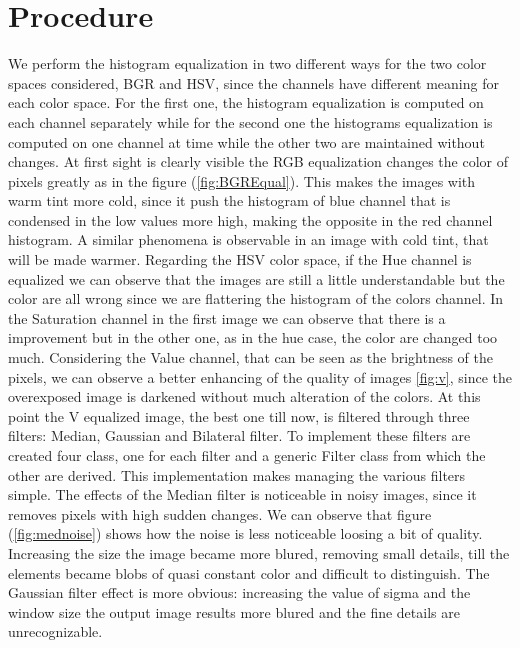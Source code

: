 \documentclass[11pt,a4paper]{article}
\newcommand{\cc}{\fontfamily{txtt}\selectfont}
\begin{document}
\section{Procedure}
We perform the histogram equalization in two different ways for the two color spaces considered, BGR and HSV, since the channels have different meaning for each color space.
For the first one, the histogram equalization is computed on each channel separately while for the second one the histograms equalization is computed on one channel at time while the other two are maintained without changes.
At first sight is clearly visible the RGB equalization changes the color of pixels greatly as in the figure (\ref{fig:BGREqual}).
This makes the images with warm tint more cold, since it push the histogram of blue channel that is condensed in the low values more high, making the opposite in the red channel histogram.
A similar phenomena is observable in an image with cold tint, that will be made warmer.\newline
Regarding the HSV color space, if the Hue channel is equalized we can observe that the images are still a little understandable but the color are all wrong since we are flattering the histogram of the colors channel.
In the Saturation channel in the first image we can observe that there is a improvement but in the other one, as in the hue case, the color are changed too much.
Considering the Value channel, that can be seen as the brightness of the pixels, we can observe a better enhancing of the quality of images \ref{fig:v}, since the overexposed image is darkened without much alteration of the colors.\newline
At this point the V equalized image, the best one till now, is filtered through three filters: Median, Gaussian and Bilateral filter.
To implement these filters are created four class, one for each filter and a generic {\cc Filter} class from which the other are derived.
This implementation makes managing the various filters simple.
The effects of the Median filter is noticeable in noisy images, since it removes pixels with high sudden changes.
We can observe that figure (\ref{fig:mednoise}) shows how the noise is less noticeable loosing a bit of quality.
Increasing the size the image became more blured, removing small details, till the elements became blobs of quasi constant color and difficult to distinguish.\newline
The Gaussian filter effect is more obvious: increasing the value of sigma and the window size the output image results more blured and the fine details are unrecognizable.
\end{document}
